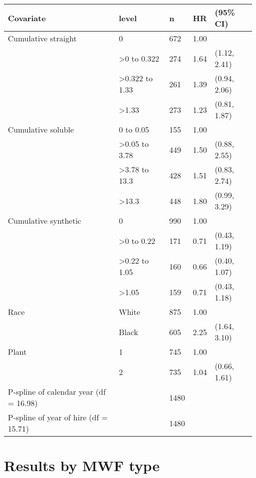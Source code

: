\documentclass[10pt,]{article}
\begin{document}
\begin{table}[H]
\centering
\begin{tabular}{lllll}
  \toprule
Covariate & level & n & HR & (95\% CI) \\ 
  \midrule
Cumulative straight & 0 & 672 & 1.00 &  \\ 
   & >0 to 0.322 & 274 & 1.64 & (1.12, 2.41) \\ 
   & >0.322 to 1.33 & 261 & 1.39 & (0.94, 2.06) \\ 
   & >1.33 & 273 & 1.23 & (0.81, 1.87) \\ 
  Cumulative soluble & 0 to 0.05 & 155 & 1.00 &  \\ 
   & >0.05 to 3.78 & 449 & 1.50 & (0.88, 2.55) \\ 
   & >3.78 to 13.3 & 428 & 1.51 & (0.83, 2.74) \\ 
   & >13.3 & 448 & 1.80 & (0.99, 3.29) \\ 
  Cumulative synthetic & 0 & 990 & 1.00 &  \\ 
   & >0 to 0.22 & 171 & 0.71 & (0.43, 1.19) \\ 
   & >0.22 to 1.05 & 160 & 0.66 & (0.40, 1.07) \\ 
   & >1.05 & 159 & 0.71 & (0.43, 1.18) \\ 
  Race & White & 875 & 1.00 &  \\ 
   & Black & 605 & 2.25 & (1.64, 3.10) \\ 
  Plant & 1 & 745 & 1.00 &  \\ 
   & 2 & 735 & 1.04 & (0.66, 1.61) \\ 
  P-spline of calendar year (df = 16.98) &  & 1480 &  &  \\ 
  P-spline of year of hire (df = 15.71) &  & 1480 &  &  \\ 
   \bottomrule
\end{tabular}
\end{table}

\hypertarget{results-by-mwf-type}{%
\section{Results by MWF type}\label{results-by-mwf-type}}
\end{document}
